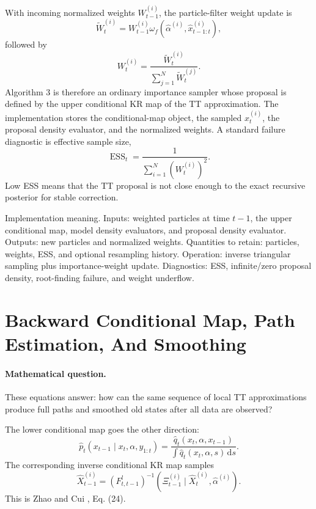 \documentclass[11pt]{article}
\numberwithin{equation}{section}
\newcommand{\dd}{\,\mathrm d}
\begin{document}
With incoming normalized weights \(W_{t-1}^{(i)}\), the particle-filter weight
update is
\begin{equation}
    \widetilde W_t^{(i)}
    =
    W_{t-1}^{(i)}
    \omega_f(\widehat\alpha^{(i)},\widehat x_{t-1:t}^{(i)}),
    \label{eq:p24-f5}
\end{equation}
followed by
\begin{equation}
    W_t^{(i)}
    =
    \frac{\widetilde W_t^{(i)}}
    {\sum_{j=1}^{N}\widetilde W_t^{(j)}}.
    \label{eq:p24-f6}
\end{equation}
Algorithm 3 is therefore an ordinary importance sampler whose proposal is
defined by the upper conditional KR map of the TT approximation.  The
implementation stores the conditional-map object, the sampled \(x_t^{(i)}\),
the proposal density evaluator, and the normalized weights.  A standard failure
diagnostic is effective sample size,
\begin{equation}
    \operatorname{ESS}_t
    =
    \frac{1}{\sum_{i=1}^{N}(W_t^{(i)})^2}.
    \label{eq:p24-f7}
\end{equation}
Low ESS means that the TT proposal is not close enough to the exact recursive
posterior for stable correction.

Implementation meaning. Inputs: weighted particles at time \(t-1\), the
upper conditional map, model density evaluators, and proposal density evaluator.
Outputs: new particles and normalized weights.  Quantities to retain: particles,
weights, ESS, and optional resampling history.  Operation: inverse triangular
sampling plus importance-weight update.  Diagnostics: ESS, infinite/zero
proposal density, root-finding failure, and weight underflow.

\section{Backward Conditional Map, Path Estimation, And Smoothing}

\paragraph{Mathematical question.}
These equations answer: how can the same sequence of local TT approximations
produce full paths and smoothed old states after all data are observed?

The lower conditional map goes the other direction:
\begin{equation}
    \widehat p_t(x_{t-1}\mid x_t,\alpha,y_{1:t})
    =
    \frac{\widehat q_t(x_t,\alpha,x_{t-1})}
    {\int \widehat q_t(x_t,\alpha,s)\dd s}.
    \label{eq:p24-b1}
\end{equation}
The corresponding inverse conditional KR map samples
\begin{equation}
    \widehat X_{t-1}^{(i)}
    =
    (F_{t,t-1}^{l})^{-1}
    \left(\Xi_{t-1}^{(i)}\mid \widehat X_t^{(i)},\widehat\alpha^{(i)}\right).
    \label{eq:p24-b2}
\end{equation}
This is Zhao and Cui \cite{zhao2024ttsequential}, Eq. (24).
\end{document}
